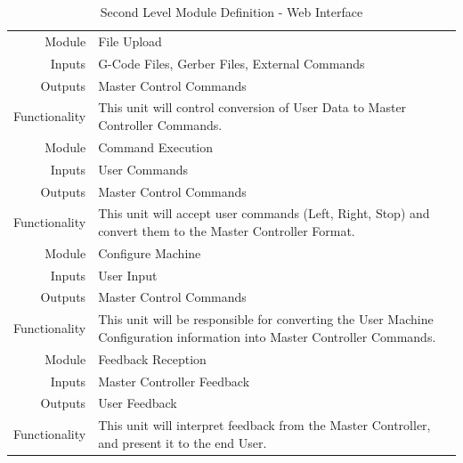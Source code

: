 \begin{table}[ht] 
	\caption{Second Level Module Definition - Web Interface}
	\label{table:secondlevelweb}
	\centering 
	\begin{tabular}{|r p{10cm}|} 
		\hline\hline 
		Module		& File Upload \\ 
		Inputs		& G-Code Files, Gerber Files, External Commands	\\ 
		Outputs		& Master Control Commands \\ 
		Functionality	& This unit will control conversion of User Data to Master Controller Commands.\\ 
		\hline\hline 
		Module		& Command Execution \\ 
		Inputs		& User Commands	\\ 
		Outputs		& Master Control Commands \\ 
		Functionality	& This unit will accept user commands (Left, Right, Stop) and convert them to the Master Controller Format.\\
		\hline\hline 
		Module		& Configure Machine \\ 
		Inputs		& User Input \\ 
		Outputs		& Master Control Commands \\ 
		Functionality	& This unit will be responsible for converting the User Machine Configuration information into Master Controller Commands.\\
		\hline\hline 
		Module		& Feedback Reception \\ 
		Inputs		& Master Controller Feedback \\ 
		Outputs		& User Feedback \\ 
		Functionality	& This unit will interpret feedback from the Master Controller, and present it to the end User. \\
		\hline
		\end{tabular} 
\end{table}

